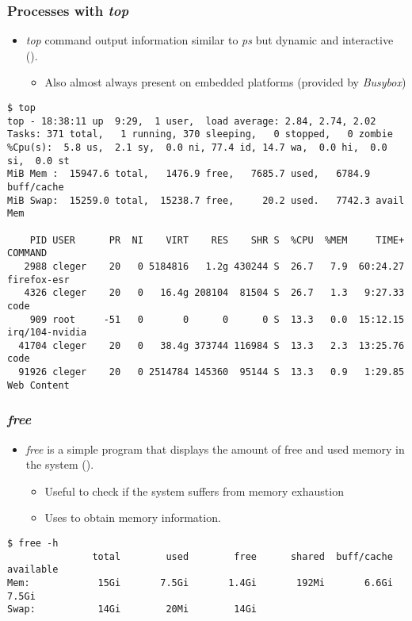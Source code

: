 \begin{frame}[fragile]
  \frametitle{Processes with {\em top}}
  \begin{itemize}
    \item {\em top} command output information similar to {\em ps} but dynamic
          and interactive ().
    \begin{itemize}
      \item Also almost always present on embedded platforms (provided by
            {\em Busybox})
    \end{itemize}
  \end{itemize}
  \begin{block}{}
    \begin{verbatim}
$ top
top - 18:38:11 up  9:29,  1 user,  load average: 2.84, 2.74, 2.02
Tasks: 371 total,   1 running, 370 sleeping,   0 stopped,   0 zombie
%Cpu(s):  5.8 us,  2.1 sy,  0.0 ni, 77.4 id, 14.7 wa,  0.0 hi,  0.0 si,  0.0 st
MiB Mem :  15947.6 total,   1476.9 free,   7685.7 used,   6784.9 buff/cache
MiB Swap:  15259.0 total,  15238.7 free,     20.2 used.   7742.3 avail Mem

    PID USER      PR  NI    VIRT    RES    SHR S  %CPU  %MEM     TIME+ COMMAND
   2988 cleger    20   0 5184816   1.2g 430244 S  26.7   7.9  60:24.27 firefox-esr
   4326 cleger    20   0   16.4g 208104  81504 S  26.7   1.3   9:27.33 code
    909 root     -51   0       0      0      0 S  13.3   0.0  15:12.15 irq/104-nvidia
  41704 cleger    20   0   38.4g 373744 116984 S  13.3   2.3  13:25.76 code
  91926 cleger    20   0 2514784 145360  95144 S  13.3   0.9   1:29.85 Web Content
    \end{verbatim}
  \end{block}
\end{frame}

\begin{frame}[fragile]
  \frametitle{{\em free}}
  \begin{itemize}
    \item {\em free} is a simple program that displays the amount of free and
          used memory in the system ().
    \begin{itemize}
      \item Useful to check if the system suffers from memory exhaustion
      \item Uses  to obtain memory information.
    \end{itemize}
  \end{itemize}
  \begin{block}{}
    \begin{verbatim}
$ free -h
               total        used        free      shared  buff/cache   available
Mem:            15Gi       7.5Gi       1.4Gi       192Mi       6.6Gi       7.5Gi
Swap:           14Gi        20Mi        14Gi
    \end{verbatim}
  \end{block}
\end{frame}

